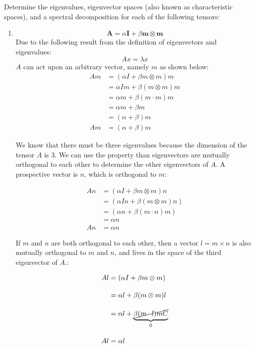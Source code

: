 \begin{problem}
    \normalfont
Determine the eigenvalues, eigenvector spaces (also known as characteristic spaces), and a spectral decomposition for each of the following tensors:
\end{problem}

\begin{enumerate}
    \item $$
    \mathbf{A} = \alpha \mathbf{I}+\beta \mathbf{m}\otimes \mathbf{m}
    $$
    Due to the following result from the definition of eigenvectors and eigenvalues:
$$
Ax=\lambda x
$$
$A$ can act upon an arbitrary vector, namely $m$ as shown below:
\begin{align*}
    Am&=(\alpha I+\beta m\otimes m)m\\[10pt]
    &=\alpha Im+\beta(m\otimes m)m\\[10pt]
    &=\alpha m+\beta(m\cdot m)m\\[10pt]
    &=\alpha m+\beta m\\[10pt]
    &=(\alpha+\beta)m\\[10pt]
    Am&=(\alpha+\beta)m
    \end{align*}

    We know that there must be three eigenvalues because the dimension of the tensor $A$ is $3$. We can use the property than eigenvectors are mutually orthogonal to each other to determine the other eigenvectors of $A$. A prospective vector is $n$, which is orthogonal to $m$:

    \begin{align*}
    An&=(\alpha I+\beta m\otimes m)n\\[10pt]
    &=(\alpha In+\beta(m\otimes m)n)\\[10pt]
    &=(\alpha n+\beta(m\cdot n)m)\\[10pt]
    &=\alpha n\\[10pt]
    An&=\alpha n
    \end{align*}
    

If $m$ and $n$ are both orthogonal to each other, then a vector $l=m\times n$ is also mutually orthogonal to $m$ and $n$, and lives in the space of the third eigenvector of $A$.:

\begin{align*}
Al&=(\alpha I+\beta m\otimes m)\\[10pt]
&=\alpha l+\beta(m\otimes m)l\\[10pt]
&=\alpha l+\underbrace{ \cancel{ \beta(m\cdot l)mC } }_{ 0 }\\[10pt]
Al&=\alpha l
\end{align*}


\end{enumerate}
